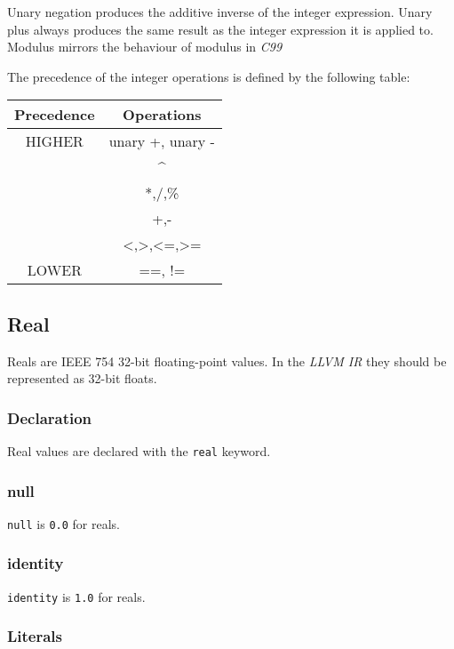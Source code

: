 \documentclass[../../gazprea.tex]{subfiles}
\begin{document}
		Unary negation produces the additive inverse of the integer expression. Unary plus always produces the same
		result as the integer expression it is applied to. Modulus mirrors the behaviour of modulus in \textit{C99}

		The precedence of the integer operations is defined by the following table:

		\begin{center}
			\begin{tabular}{|c|c|}
			\hline
			\textbf{Precedence} & \textbf{Operations} \\
			\hline
			HIGHER & unary +, unary - \\
			       & \textasciicircum \\
			       & *,/,\%		        \\
			       & +,-   		        \\
			       & <,>,<=,>=        \\
			LOWER  & ==, !=		        \\
			\hline
			\end{tabular}
		\end{center}


	\subsection{Real}\label{sec:real}

		Reals are IEEE 754 32-bit floating-point values. In the \textit{LLVM IR} they should be represented as 32-bit
		floats.

	\subsubsection{Declaration}

		Real values are declared with the \texttt{real} keyword.

	\subsubsection{null}

		\texttt{null} is \texttt{0.0} for reals.

	\subsubsection{identity}

		\texttt{identity} is \texttt{1.0} for reals.

	\subsubsection{Literals}
  \label{sssec:real_lit}
\end{document}
